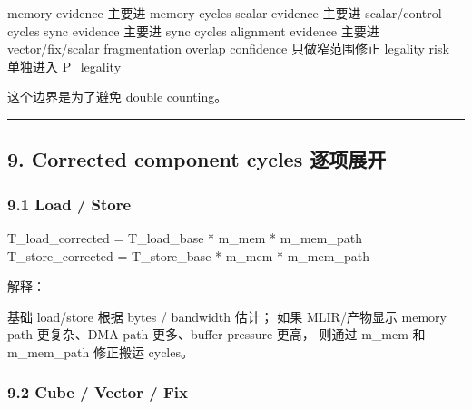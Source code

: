 \documentclass[
  10pt,
]{article}
\newenvironment{Shaded}{}{}
\newcommand{\NormalTok}[1]{#1}
\begin{document}
\begin{Shaded}
\begin{Highlighting}[]
\NormalTok{memory evidence 主要进 memory cycles}
\NormalTok{scalar evidence 主要进 scalar/control cycles}
\NormalTok{sync evidence 主要进 sync cycles}
\NormalTok{alignment evidence 主要进 vector/fix/scalar fragmentation}
\NormalTok{overlap confidence 只做窄范围修正}
\NormalTok{legality risk 单独进入 P\_legality}
\end{Highlighting}
\end{Shaded}

这个边界是为了避免 double counting。

\begin{center}\rule{0.5\linewidth}{0.5pt}\end{center}

\subsection{9. Corrected component cycles
逐项展开}\label{corrected-component-cycles-ux9010ux9879ux5c55ux5f00}

\subsubsection{9.1 Load / Store}\label{load-store}

\begin{Shaded}
\begin{Highlighting}[]
\NormalTok{T\_load\_corrected  = T\_load\_base  * m\_mem * m\_mem\_path}
\NormalTok{T\_store\_corrected = T\_store\_base * m\_mem * m\_mem\_path}
\end{Highlighting}
\end{Shaded}

解释：

\begin{Shaded}
\begin{Highlighting}[]
\NormalTok{基础 load/store 根据 bytes / bandwidth 估计；}
\NormalTok{如果 MLIR/产物显示 memory path 更复杂、DMA path 更多、buffer pressure 更高，}
\NormalTok{则通过 m\_mem 和 m\_mem\_path 修正搬运 cycles。}
\end{Highlighting}
\end{Shaded}

\subsubsection{9.2 Cube / Vector / Fix}\label{cube-vector-fix}
\end{document}
